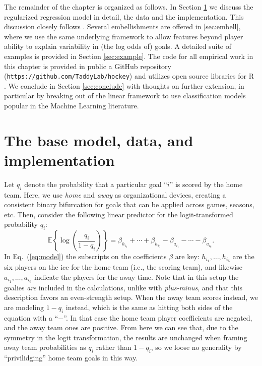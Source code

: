 The remainder of the chapter is organized as follows.  In Section
\ref{sec:base} we discuss the regularized regression model in detail, the data
and the implementation.  This discussion closely follows
\cite{gramacy:jensen:taddy:2013}.  Several embellishments are offered in
\ref{sec:embell}, where we use the same underlying framework to allow
features beyond player ability to explain variability in (the log odds of)
goals. A detailed suite of examples is provided in Section \ref{sec:example}.
The code for all empirical work in this chapter is provided in public a GitHub
repository (\verb!https://github.com/TaddyLab/hockey!) and utilizes open
source libraries for {\sf R} \cite{cranR}.  We conclude in Section
\ref{sec:conclude} with thoughts on further extension, in particular by
breaking out of the linear framework to use classification models
popular in the Machine Learning literature.

\section{The base model, data, and implementation}
\label{sec:base}

Let $q_i$ denote the probability that a particular goal ``$i$'' is scored by
the home team.  Here, we use {\em home} and {\em away} as organizational devices,
creating a consistent binary bifurcation for goals that can be applied across games,
seasons, etc.  Then, consider the following linear predictor
for the logit-transformed probability $q_i$:
\begin{equation}
\mathbb{E}\left\{\log \left(\frac{q_i}{1-q_i} \right)\right\} 
= \beta_{h_{i_1}} + \cdots + \beta_{h_{i_6}} - 
\beta_{a_{i_1}} - \cdots - \beta_{a_{i_6}}.
\label{eq:model}
\end{equation}
In Eq.~(\ref{eq:model}) the subscripts on the coefficients $\beta$ are
key: $h_{i_1}, \dots, h_{i_6}$ are the six players on the ice for the home
team (i.e., the scoring team), and likewise $a_{i_1}, \dots, a_{i_6}$ indicate
the players for the away time.  Note that in this setup the goalies {\em are}
included in the calculations, unlike with {\em plus-minus}, and that this
description favors an even-strength setup.  When the away team scores instead,
we are modeling $1-q_i$ instead, which is the same as hitting both sides of
the equation with a ``$-$''.  In that case the home team player coefficients
are negated, and the away team ones are positive.  From here we can see that,
due to the symmetry in the logit transformation, the results are unchanged
when framing away team probabilities as $q_i$ rather than $1-q_i$, so we loose
no generality by ``privilidging'' home team goals in this way.

